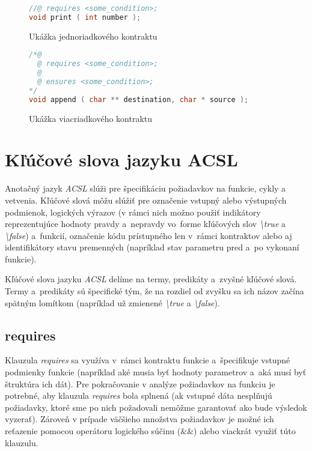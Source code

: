\begin{figure}[H]
    \centering
    \captionsetup{justification=centering}
\begin{lstlisting}[language=C]
//@ requires <some_condition>;
void print ( int number );
\end{lstlisting}
    \caption{Ukážka jednoriadkového kontraktu}
    \label{fig:jednoduchy-kontrakt-jednoriadkovy}
\end{figure}

\begin{figure}[H]
    \centering
    \captionsetup{justification=centering}
\begin{lstlisting}[language=C]
/*@
  @ requires <some_condition>;
  @
  @ ensures <some_condition>;
*/
void append ( char ** destination, char * source );
\end{lstlisting}
    \caption{Ukážka viacriadkového kontraktu}
    \label{fig:jednoduchy-kontrakt-viacriadkovy}
\end{figure}

\section{Kľúčové slova jazyku ACSL}

Anotačný jazyk \emph{ACSL} slúži pre špecifikáciu požiadavkov na funkcie, cykly a vetvenia. Kľúčové slová môžu slúžiť pre označenie vstupný alebo výstupných podmienok, logických výrazov (v rámci nich možno použiť indikátory reprezentujúce hodnoty pravdy a~nepravdy vo~forme kľúčových slov \emph{\textbackslash true} a \emph{\textbackslash false}) a~funkcií, označenie kódu prístupného len v~rámci kontraktov alebo aj identifikátory stavu premenných (napríklad stav parametru pred a~po vykonaní funkcie).

Kľúčové slova jazyku \emph{ACSL} delíme na termy, predikáty a~zvyšné kľúčové slová. Termy a~predikáty sú špecifické tým, že na rozdiel od zvyšku sa ich názov začína spätným lomítkom (napríklad už zmienené \emph{\textbackslash true} a \emph{\textbackslash false}). \cite{keywords-acsl}

\subsection{requires} \label{chapter:requires}

Klauzula \emph{requires} sa využíva v~rámci kontraktu funkcie a~špecifikuje vstupné podmienky funkcie (napríklad aké musia byť hodnoty parametrov a~aká musí byť štruktúra ich dát). Pre pokračovanie v analýze požiadavkov na funkciu je potrebné, aby klauzula \emph{requires} bola splnená (ak vstupné dáta nesplňujú požiadavky, ktoré sme po nich požadovali nemôžme garantovať ako bude výsledok vyzerať). Zároveň v prípade väčšieho množstva požiadavkov je možné ich reťazenie pomocou operátoru logického súčinu (\&\&) alebo viackrát využiť túto klauzulu.

